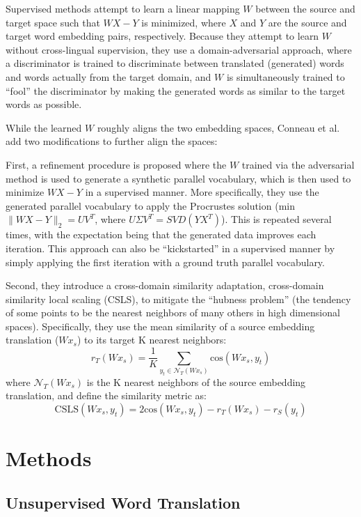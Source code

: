 \documentclass{article}
\begin{document}
Supervised methods attempt to learn a linear mapping $W$ between the source and target
space such that $WX-Y$ is minimized, where $X$ and $Y$ are the source and target word
embedding pairs, respectively. Because they attempt to learn $W$ without cross-lingual 
supervision, they use a domain-adversarial approach, where a discriminator is trained
to discriminate between translated (generated) words and words actually from the
target domain, and $W$ is simultaneously trained to ``fool'' the discriminator by making
the generated words as similar to the target words as possible.

While the learned $W$ roughly aligns the two embedding spaces, Conneau et al. add two
modifications to further align the spaces:

First, a refinement procedure is proposed where the $W$ trained via the
adversarial method is used to generate a synthetic parallel vocabulary, which is
then used to minimize $WX-Y$ in a supervised manner. More specifically, they use
the generated parallel vocabulary to apply the Procrustes solution (min $\|WX-Y\|_2 = UV^T$, where $U\Sigma V^T = SVD(YX^T)$). This is repeated several
times, with the expectation being that the generated data improves each iteration.
This approach can also be ``kickstarted'' in a supervised manner by simply applying
the first iteration with a ground truth parallel vocabulary.

Second, they introduce a cross-domain similarity adaptation, cross-domain
similarity local scaling (CSLS), to mitigate the ``hubness problem'' (the
tendency of some points to be the nearest neighbors of many others in high
dimensional spaces). Specifically, they use the mean similarity of a source
embedding translation ($Wx_s$) to its target K nearest neighbors:
$$
r_T(Wx_s)=\frac{1}{K}\sum_{y_t \in \mathcal{N}_T(Wx_s)} \text{cos}(Wx_s, y_t)
$$
where $\mathcal{N}_T(Wx_s)$ is the K nearest neighbors of the source embedding
translation, and define the similarity metric as:
$$
\text{CSLS}(Wx_s,y_t)=2\text{cos}(Wx_s, y_t)-r_T(Wx_s)-r_S(y_t)
$$

\section*{Methods}

\subsection*{Unsupervised Word Translation}
\end{document}
